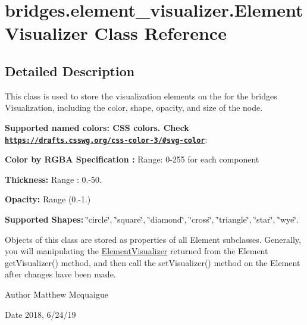 \hypertarget{classbridges_1_1element__visualizer_1_1_element_visualizer}{}\section{bridges.\+element\+\_\+visualizer.\+Element\+Visualizer Class Reference}
\label{classbridges_1_1element__visualizer_1_1_element_visualizer}


\subsection{Detailed Description}
This class is used to store the visualization elements on the for the bridges Visualization, including the color, shape, opacity, and size of the node. 

{\bfseries Supported named colors\+: C\+SS colors. Check \href{https://drafts.csswg.org/css-color-3/#svg-color}{\tt https\+://drafts.\+csswg.\+org/css-\/color-\/3/\#svg-\/color}}\+: 

{\bfseries  Color by R\+G\+BA Specification \+:} Range\+: 0-\/255 for each component 

{\bfseries  Thickness\+: } Range \+: 0.-\/50.

{\bfseries  Opacity\+: } Range (0.-\/1.) 

{\bfseries  Supported Shapes\+: } \char`\"{}circle\char`\"{}, \char`\"{}square\char`\"{}, \char`\"{}diamond\char`\"{}, \char`\"{}cross\char`\"{}, \char`\"{}triangle\char`\"{}, \char`\"{}star\char`\"{}, \char`\"{}wye\char`\"{}.

Objects of this class are stored as properties of all Element subclasses. Generally, you will manipulating the \mbox{\hyperlink{classbridges_1_1element__visualizer_1_1_element_visualizer}{Element\+Visualizer}} returned from the Element get\+Visualizer() method, and then call the set\+Visualizer() method on the Element after changes have been made.

\begin{DoxyAuthor}{Author}
Matthew Mcquaigue
\end{DoxyAuthor}
\begin{DoxyDate}{Date}
2018, 6/24/19 
\end{DoxyDate}
